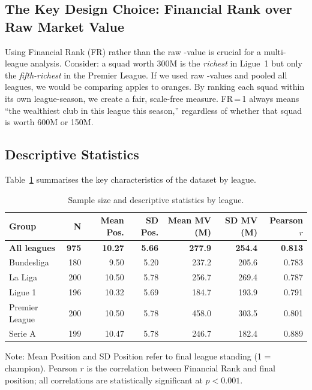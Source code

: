 \documentclass[11pt, a4paper]{article}
\begin{document}
\subsection{The Key Design Choice: Financial Rank over Raw Market Value}

Using Financial Rank (FR) rather than the raw \EUR{}-value is crucial for a
multi-league analysis. Consider: a squad worth \EUR{}300M is the \emph{richest}
in Ligue~1 but only the \emph{fifth-richest} in the Premier League. If we used
raw \EUR{}-values and pooled all leagues, we would be comparing apples to oranges.
By ranking each squad within its own league-season, we create a fair, scale-free
measure. FR\,=\,1 always means ``the wealthiest club in this league this season,''
regardless of whether that squad is worth \EUR{}600M or \EUR{}150M.

\subsection{Descriptive Statistics}

Table~\ref{tab:desc} summarises the key characteristics of the dataset by league.

\begin{table}[H]
  \centering
  \small
  \caption{Sample size and descriptive statistics by league.}
  \label{tab:desc}
  \begin{tabular}{l r r r r r r}
    \toprule
    \rowcolor{NavyBlue}
    \color{white}\textbf{Group} &
    \color{white}\textbf{N} &
    \color{white}\textbf{Mean Pos.} &
    \color{white}\textbf{SD Pos.} &
    \color{white}\textbf{Mean MV (M\EUR{})} &
    \color{white}\textbf{SD MV (M\EUR{})} &
    \color{white}\textbf{Pearson $r$} \\
    \midrule
    \rowcolor{RowA}
    \textbf{All leagues} & \textbf{975} & \textbf{10.27} & \textbf{5.66}
      & \textbf{277.9} & \textbf{254.4} & \textbf{0.813} \\
    Bundesliga      & 180 & 9.50  & 5.20 & 237.2 & 205.6 & 0.783 \\
    La Liga         & 200 & 10.50 & 5.78 & 256.7 & 269.4 & 0.787 \\
    Ligue 1         & 196 & 10.32 & 5.69 & 184.7 & 193.9 & 0.791 \\
    Premier League  & 200 & 10.50 & 5.78 & 458.0 & 303.5 & 0.801 \\
    Serie A         & 199 & 10.47 & 5.78 & 246.7 & 182.4 & 0.889 \\
    \bottomrule
  \end{tabular}
  \medskip

  \noindent\small Note: Mean Position and SD Position refer to final league
  standing (1 = champion). Pearson $r$ is the correlation between Financial Rank
  and final position; all correlations are statistically significant at $p < 0.001$.
\end{table}
\end{document}
